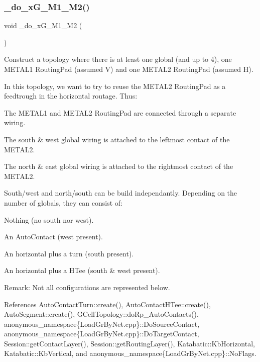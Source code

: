 \subsubsection{\texorpdfstring{\+\_\+do\+\_\+x\+G\+\_\+M1\+\_\+M2()}{\_do\_xG\_1M1\_1M2()}}
{\footnotesize\ttfamily void \+\_\+do\+\_\+x\+G\+\_\+M1\+\_\+M2 (\begin{DoxyParamCaption}{ }\end{DoxyParamCaption})\hspace{0.3cm}{\ttfamily [private]}}

Construct a topology where there is at least one global (and up to 4), one {\ttfamily M\+E\+T\+A\+L1} Routing\+Pad (assumed V) and one {\ttfamily M\+E\+T\+A\+L2} Routing\+Pad (assumed H).

In this topology, we want to try to reuse the {\ttfamily M\+E\+T\+A\+L2} Routing\+Pad as a feedtrough in the horizontal routage. Thus\+:
\begin{DoxyItemize}
\item The {\ttfamily M\+E\+T\+A\+L1} and {\ttfamily M\+E\+T\+A\+L2} Routing\+Pad are connected through a separate wiring.
\item The south \& west global wiring is attached to the leftmost contact of the {\ttfamily M\+E\+T\+A\+L2}.
\item The north \& east global wiring is attached to the rightmost contact of the {\ttfamily M\+E\+T\+A\+L2}.
\end{DoxyItemize}

South/west and north/south can be build independantly. Depending on the number of globals, they can consist of\+:
\begin{DoxyItemize}
\item Nothing (no south nor west).
\item An Auto\+Contact (west present).
\item An horizontal plus a turn (south present).
\item An horizontal plus a H\+Tee (south \& west present).
\end{DoxyItemize}

\begin{DoxyParagraph}{Remark\+: Not all configurations are represented below.}

\end{DoxyParagraph}
 

References Auto\+Contact\+Turn\+::create(), Auto\+Contact\+H\+Tee\+::create(), Auto\+Segment\+::create(), G\+Cell\+Topology\+::do\+Rp\+\_\+\+Auto\+Contacts(), anonymous\+\_\+namespace\{\+Load\+Gr\+By\+Net.\+cpp\}\+::\+Do\+Source\+Contact, anonymous\+\_\+namespace\{\+Load\+Gr\+By\+Net.\+cpp\}\+::\+Do\+Target\+Contact, Session\+::get\+Contact\+Layer(), Session\+::get\+Routing\+Layer(), Katabatic\+::\+Kb\+Horizontal, Katabatic\+::\+Kb\+Vertical, and anonymous\+\_\+namespace\{\+Load\+Gr\+By\+Net.\+cpp\}\+::\+No\+Flags.

